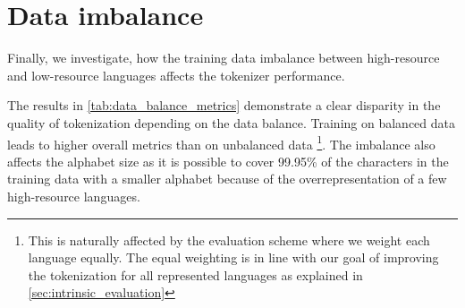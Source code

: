 \section{Data imbalance}
\label{sec:tokenizer_training_with_data_imbalance}






Finally, we investigate, how the training data imbalance between high-resource and low-resource languages affects the tokenizer performance.

The results in \autoref{tab:data_balance_metrics} demonstrate a clear disparity in the quality of tokenization depending on the data balance. Training on balanced data leads to higher overall metrics than on unbalanced data \footnote{This is naturally affected by the evaluation scheme where we weight each language equally. The equal weighting is in line with our goal of improving the tokenization for all represented languages as explained in \autoref{sec:intrinsic_evaluation}}. The imbalance also affects the alphabet size as it is possible to cover 99.95\% of the characters in the training data with a smaller alphabet because of the overrepresentation of a few high-resource languages.

